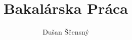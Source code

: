 \documentclass[a4paper,12pt]{report}
\author{Dušan Ščensný}
\title{Bakalárska Práca}
\begin{document}
\thispagestyle{empty}
\renewcommand\thepage{}
\tableofcontents	%
\newpage
\renewcommand\thepage{\arabic{page}}
\listoffigures    	%
\end{document}

